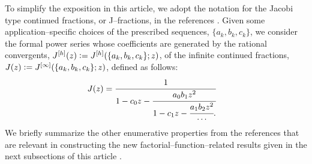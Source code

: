 \documentclass[12pt,reqno]{article}
\numberwithin{sfootnote}{section}
\numberwithin{equation}{section}
\theoremstyle{DefaultTheoremStyle}
\theoremstyle{definition}
\newcommand{\cf}[0]{cf.\ }
\newcommand{\defequals}{\ensuremath{\vcentcolon=}}
\begin{document}
To simplify the exposition in this article, we adopt the 
notation for the Jacobi type continued fractions, or J--fractions, 
in the references 
\citep{FLAJOLET80B,FLAJOLET82} 
\citep[\cf \S 3.10]{NISTHB} \citep[\cf \S 5.5]{GFLECT}. 
Given some application--specific choices of the prescribed 
sequences, $\{a_k, b_k, c_k\}$, we consider the 
formal power series whose coefficients are generated by the 
rational convergents, $J^{[h]}(z) \defequals J^{[h]}(\{a_k, b_k, c_k\}; z)$, 
of the infinite continued fractions, 
$J(z) \defequals J^{[\infty]}(\{a_k, b_k, c_k\}; z)$, defined as follows: 
\begin{align} 
\label{eqn_CF_exp_general_form} 
J(z) & = 
     \cfrac{1}{1-c_0z-\cfrac{a_0b_1 z^2}{1-c_1z- 
     \cfrac{a_1b_2 z^2}{\cdots}.}} 
\end{align} 
We briefly summarize the other enumerative properties from the 
references that are 
relevant in constructing the new factorial--function--related results 
given in the next subsections of this article 
\citep{FLAJOLET82,FLAJOLET80B} \citep[\S 5.5]{GFLECT} \citep[\cf \S 6.7]{GKP}. 
\end{document}
